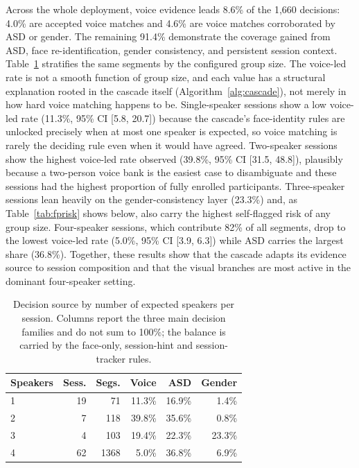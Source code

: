 \documentclass[conference]{IEEEtran}
\begin{document}
Across the whole deployment, voice evidence leads 8.6\% of the 1{,}660
decisions: 4.0\% are accepted voice matches and 4.6\% are voice matches
corroborated by ASD or gender. The remaining 91.4\% demonstrate the
coverage gained from ASD, face re-identification, gender consistency,
and persistent session context. Table~\ref{tab:byspeakers} stratifies
the same segments by the configured group size. The
voice-led rate is not a smooth function of group size, and each value
has a structural explanation rooted in the cascade itself
(Algorithm~\ref{alg:cascade}), not merely in how hard voice matching
happens to be. Single-speaker sessions show a low voice-led rate
(11.3\%, 95\% CI [5.8, 20.7]) because the cascade's face-identity rules are unlocked
precisely when at most one speaker is expected, so voice matching is
rarely the deciding rule even when it would have agreed. Two-speaker
sessions show the highest voice-led rate observed (39.8\%, 95\% CI
[31.5, 48.8]), plausibly
because a two-person voice bank is the easiest case to disambiguate and
these sessions had the highest proportion of fully enrolled
participants. Three-speaker sessions lean heavily on the
gender-consistency layer (23.3\%) and, as Table~\ref{tab:fprisk} shows
below, also carry the highest self-flagged risk of any group size.
Four-speaker sessions, which contribute 82\% of all segments, drop to
the lowest voice-led rate (5.0\%, 95\% CI [3.9, 6.3]) while ASD carries
the largest share (36.8\%). Together, these results show that the
cascade adapts its evidence source to session composition and that the
visual branches are most active in the dominant four-speaker setting.

\begin{table}[h]
\caption{Decision source by number of expected speakers per session.
Columns report the three main decision families and do not sum to
100\%; the balance is carried by the face-only, session-hint and
session-tracker rules.}
\begin{center}
\begin{tabular}{lrrrrr}
\hline
\textbf{Speakers} & \textbf{Sess.} & \textbf{Segs.} & \textbf{Voice} & \textbf{ASD} & \textbf{Gender} \\
\hline
1 & 19 &   71 & 11.3\% & 16.9\% &  1.4\% \\
2 &  7 &  118 & 39.8\% & 35.6\% &  0.8\% \\
3 &  4 &  103 & 19.4\% & 22.3\% & 23.3\% \\
4 & 62 & 1368 &  5.0\% & 36.8\% &  6.9\% \\
\hline
\end{tabular}
\label{tab:byspeakers}
\end{center}
\end{table}
\end{document}
